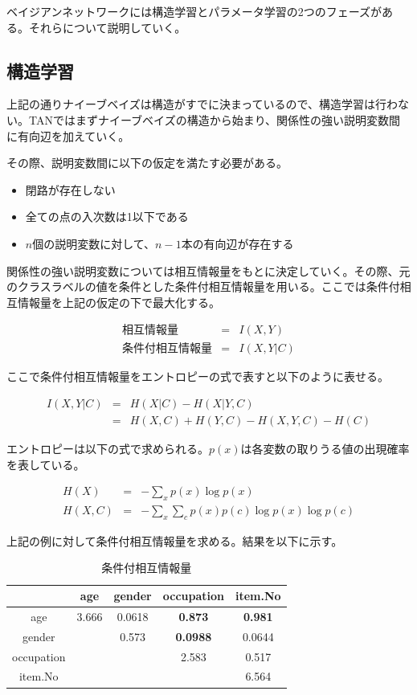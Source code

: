 \documentclass[a4j,12pt]{jarticle}
\begin{document}
ベイジアンネットワークには構造学習とパラメータ学習の2つのフェーズがある。それらについて説明していく。

\subsection{構造学習}

上記の通りナイーブベイズは構造がすでに決まっているので、構造学習は行わない。TANではまずナイーブベイズの構造から始まり、関係性の強い説明変数間に有向辺を加えていく。

その際、説明変数間に以下の仮定を満たす必要がある。

\begin{itemize}
\item 閉路が存在しない

\item 全ての点の入次数は1以下である

\item $n$個の説明変数に対して、$n-1$本の有向辺が存在する
\end{itemize}

関係性の強い説明変数については相互情報量をもとに決定していく。その際、元のクラスラベルの値を条件とした条件付相互情報量を用いる。ここでは条件付相互情報量を上記の仮定の下で最大化する。

\begin{eqnarray*}
\mbox{相互情報量} &=& I(X, Y) \\
\mbox{条件付相互情報量} &=& I(X, Y | C)
\end{eqnarray*}

ここで条件付相互情報量をエントロピーの式で表すと以下のように表せる。

\begin{eqnarray*}
I(X, Y | C) &=& H(X|C) - H(X|Y, C) \\
               &=& H(X, C) + H(Y, C) - H(X, Y, C) - H(C)
\end{eqnarray*}

エントロピーは以下の式で求められる。$p(x)$は各変数の取りうる値の出現確率を表している。

\begin{eqnarray*}
H(X) &=& - \sum_x p(x) \log p(x) \\
H(X, C) &=& - \sum_x \sum_c p(x) p(c) \log p(x) \log p(c)
\end{eqnarray*}

上記の例に対して条件付相互情報量を求める。結果を以下に示す。

\begin{table}[H]
\begin{center}
\caption{条件付相互情報量}
\begin{tabular}{|c||c|c|c|c|} \hline  
& age & gender & occupation & item.No \\ \hline \hline
age & 3.666 & 0.0618 & \bf{0.873} & \bf{0.981} \\
gender &  & 0.573 & \bf{0.0988} & 0.0644 \\
occupation &  &  & 2.583 & 0.517 \\
item.No &  &  &  & 6.564 \\ \hline
\end{tabular}
\end{center}
\end{table}
\end{document}
